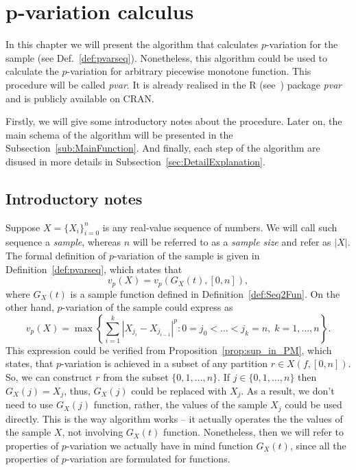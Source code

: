 \documentclass[12pt, a4paper]{article}
\numberwithin{equation}{section}
\begin{document}
\section{p-variation calculus}  
\label{sec:pvarcalc}  
  
In this chapter we will present the algorithm that calculates 
$p$-variation for the sample (see Def.~\ref{def:pvarseq}). 
Nonetheless, this algorithm could be used to calculate
the $p$-variation for arbitrary piecewise monotone function. 
This procedure will be called \emph{pvar}. 
It is already realised in the R (see~\cite{R}) package \emph{pvar} and
is publicly available on CRAN\footnotemark.

Firstly, we will give some introductory notes about the
procedure. Later on, the main schema of the
algorithm will be presented in the
Subsection~\ref{sub:MainFunction}. And finally, 
each step of the algorithm are disused in more details in 
Subsection~\ref{sec:DetailExplanation}.

\subsection{Introductory notes}


Suppose $X=\{X_{i}\}_{i=0}^{n}$ is any real-value sequence of numbers. 
We will call such sequence a \emph{sample}, 
whereas $n$ will be referred to as a \emph{sample size}
and refer as $|X|$.
The formal definition of $p$-variation 
of the sample is given in Definition~\ref{def:pvarseq}, 
which states that
\begin{equation}
  v_p(X) = v_p(G_X(t),[0,n]),
\end{equation}
where $G_X(t)$ is a sample function defined in  
Definition~\ref{def:Seq2Fun}.
On the other hand, 
$p$-variation of the sample could express as
\begin{equation}
  v_p(X) = \max\left\{ \sum_{i=1}^k |X_{j_i} - X_{j_{i-1}}|^p :
  0=j_0<\dots<j_k=n,\; k=1,\dots,n  \right\}.
\end{equation}
This expression could be verified from
Proposition~\ref{prop:sup_in_PM},
which states, that $p$-variation
is achieved in a subset of any partition $r \in X(f, [0,n])$.
So, we can construct $r$ from the subset $\{0, 1, \dots, n\}$. 
If $j \in \{0, 1, \dots, n\}$ then $G_X(j) = X_j$, thus,
$G_X(j)$ could be replaced with $X_j$. As a result,
we don't need to use $G_X(j)$ function, rather, 
the values of the sample $X_j$ could be used directly. 
This is the way algorithm works --
it actually operates the the values of the sample $X$,
not involving $G_X(t)$ function. Nonetheless,
then we will refer to properties of $p$-variation
we actually have in mind function $G_X(t)$, since all
the properties of $p$-variation are formulated for functions.
\end{document}
